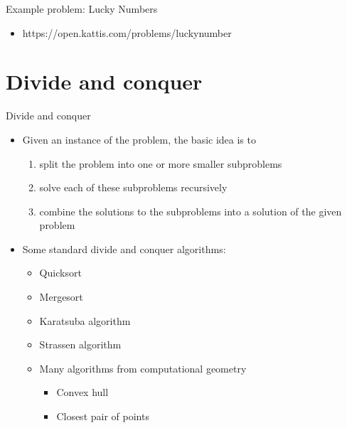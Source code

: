 \documentclass[10pt]{beamer}
\newcommand{\bi}{\begin{itemize}}
\newcommand{\ei}{\end{itemize}}
\begin{document}
\begin{frame}{Example problem: Lucky Numbers}
    \bi
        \item https://open.kattis.com/problems/luckynumber
    \ei
\end{frame}

\section{Divide and conquer}
\begin{frame}{Divide and conquer}
    \bi
        \item Given an instance of the problem, the basic idea is to
            \begin{enumerate}
                \item split the problem into one or more smaller subproblems
                \item solve each of these subproblems recursively
                \item combine the solutions to the subproblems into a solution of the given problem
            \end{enumerate}

        \vspace{10pt}

        \item Some standard divide and conquer algorithms:
            \bi
                \item Quicksort
                \item Mergesort
                \item Karatsuba algorithm
                \item Strassen algorithm
                \item Many algorithms from computational geometry
                    \bi
                        \item Convex hull
                        \item Closest pair of points
                    \ei
            \ei
    \ei
\end{frame}
\end{document}
